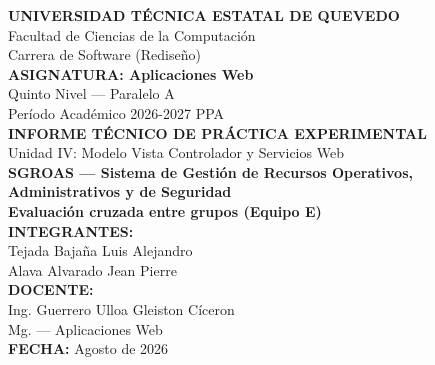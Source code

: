 \begin{titlepage}
\centering
\vspace*{1cm}
{\LARGE \textbf{UNIVERSIDAD TÉCNICA ESTATAL DE QUEVEDO}}\\[0.3cm]
{\large Facultad de Ciencias de la Computación}\\[0.2cm]
{\large Carrera de Software (Rediseño)}\\[0.8cm]

{\large \textbf{ASIGNATURA: Aplicaciones Web}}\\[0.3cm]
{\large Quinto Nivel --- Paralelo A}\\[0.3cm]
{\large Período Académico 2026-2027 PPA}\\[1.2cm]

{\Large \textbf{INFORME TÉCNICO DE PRÁCTICA EXPERIMENTAL}}\\[0.3cm]
{\large Unidad IV: Modelo Vista Controlador y Servicios Web}\\[0.6cm]
{\LARGE \textbf{SGROAS --- Sistema de Gestión de Recursos Operativos, Administrativos y de Seguridad}}\\[1.2cm]

{\large \textbf{Evaluación cruzada entre grupos (Equipo E)}}\\[0.5cm]

\vfill
{\large \textbf{INTEGRANTES:}}\\[0.3cm]
{\large Tejada Bajaña Luis Alejandro}\\[0.1cm]
{\large Alava Alvarado Jean Pierre}\\[1cm]

{\large \textbf{DOCENTE:}}\\[0.3cm]
{\large Ing. Guerrero Ulloa Gleiston Cíceron}\\[0.3cm]
{\large Mg. --- Aplicaciones Web}\\[1cm]

{\large \textbf{FECHA:} Agosto de 2026}\\[0.5cm]
\end{titlepage}